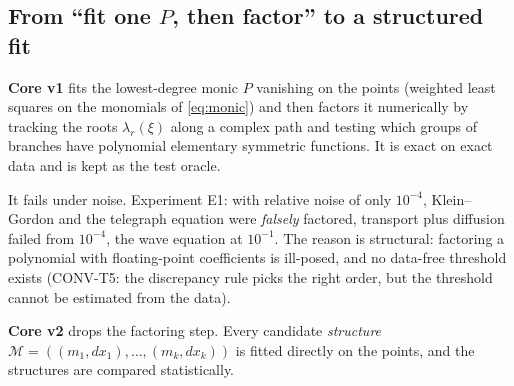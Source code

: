 \subsection{From ``fit one $P$, then factor'' to a structured fit}\label{sec:structfit}
\textbf{Core v1} fits the lowest-degree monic $P$ vanishing on the points (weighted least squares on the monomials of \eqref{eq:monic}) and then factors it numerically by tracking the roots $\lambda_r(\xi)$ along a complex path and testing which groups of branches have polynomial elementary symmetric functions. It is exact on exact data and is kept as the test oracle.

It fails under noise. Experiment E1: with relative noise of only $10^{-4}$, Klein--Gordon and the telegraph equation were \emph{falsely} factored, transport plus diffusion failed from $10^{-4}$, the wave equation at $10^{-1}$. The reason is structural: factoring a polynomial with floating-point coefficients is ill-posed, and no data-free threshold exists  (CONV-T5: the discrepancy rule picks the right order, but the threshold cannot be estimated from the data).

\textbf{Core v2} drops the factoring step. Every candidate \emph{structure} $\mathcal M=((m_1,dx_1),\dots,(m_k,dx_k))$ is fitted directly on the points, and the structures are compared statistically.

